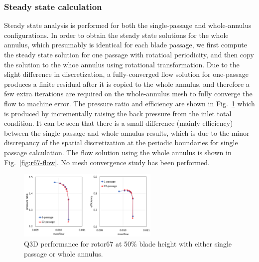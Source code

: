 \documentclass[journal,final]{new-aiaa}
\begin{document}
\subsubsection{Steady state calculation}
Steady state analysis is performed for both
the single-passage and whole-annulus
configurations. In order to obtain the steady state
solutions for the whole annulus, which presumably
is identical for each blade passage, we first compute
the steady state solution for one passage with
rotatioal periodicity, and then copy the solution
to the whoe annulus using rotational transformation.
Due to the slight difference in discretization, a fully-converged
flow solution for one-passage produces a finite residual
after it is copied to the whole annulus, and therefore a few
extra iterations are required on the whole-annulus mesh to
fully converge the flow to machine error.
The pressure ratio and efficiency are shown
in Fig.~\ref{fig:r67-performance}
which is produced by incrementally raising the back pressure
from the inlet total condition. It can be seen that there is a small
difference (mainly efficiency) between the single-passage and
whole-annulus results, which is due to the minor discrepancy
of the spatial discretization at the periodic boundaries for single
passage calculation.
The flow solution using the whole annulus is shown in Fig.~\ref{fig:r67-flow}.
No mesh convergence study has been performed.


\begin{figure}[htb]
	\centering   
	\includegraphics[width=0.6\textwidth]{pic/rotor67-performance.png}
	\caption{Q3D performance for rotor67 at 50\% blade height with either
		single passage or whole annulus.}
	\label{fig:r67-performance}
\end{figure}
\end{document}
